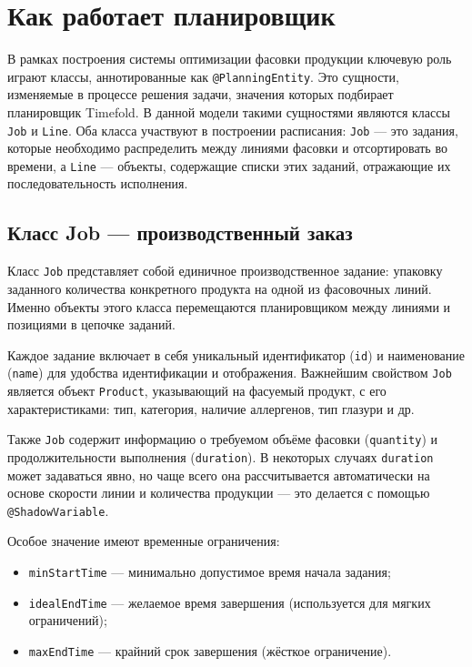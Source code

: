 \section{Как работает планировщик}

В рамках построения системы оптимизации фасовки продукции ключевую роль играют классы, аннотированные как \texttt{@PlanningEntity}. Это сущности, изменяемые в процессе решения задачи, значения которых подбирает планировщик Timefold. В данной модели такими сущностями являются классы \texttt{Job} и \texttt{Line}. Оба класса участвуют в построении расписания: \texttt{Job} — это задания, которые необходимо распределить между линиями фасовки и отсортировать во времени, а \texttt{Line} — объекты, содержащие списки этих заданий, отражающие их последовательность исполнения.

\subsection*{Класс Job — производственный заказ}

Класс \texttt{Job} представляет собой единичное производственное задание: упаковку заданного количества конкретного продукта на одной из фасовочных линий. Именно объекты этого класса перемещаются планировщиком между линиями и позициями в цепочке заданий.

Каждое задание включает в себя уникальный идентификатор (\texttt{id}) и наименование (\texttt{name}) для удобства идентификации и отображения. Важнейшим свойством \texttt{Job} является объект \texttt{Product}, указывающий на фасуемый продукт, с его характеристиками: тип, категория, наличие аллергенов, тип глазури и др.

Также \texttt{Job} содержит информацию о требуемом объёме фасовки (\texttt{quantity}) и продолжительности выполнения (\texttt{duration}). В некоторых случаях \texttt{duration} может задаваться явно, но чаще всего она рассчитывается автоматически на основе скорости линии и количества продукции — это делается с помощью \texttt{@ShadowVariable}.

Особое значение имеют временные ограничения:
\begin{itemize}
    \item \texttt{minStartTime} — минимально допустимое время начала задания;
    \item \texttt{idealEndTime} — желаемое время завершения (используется для мягких ограничений);
    \item \texttt{maxEndTime} — крайний срок завершения (жёсткое ограничение).
\end{itemize}

